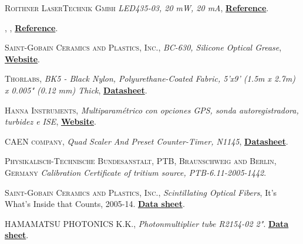\begin{thebibliography}{100}
 \textsc{Roithner LaserTechnik Gmbh}
\textit{LED435-03, 20 mW, 20 mA}, \href{http://www.roithner-laser.com/led_diverse.html}{\textbf{Reference}}.

 \textsc{},
\textit{}, \href{}{\textbf{Reference}}.

 \textsc{Saint-Gobain Ceramics and Plastics, Inc.},
\textit{BC-630, Silicone Optical Grease}, \href{https://www.crystals.saint-gobain.com/}{\textbf{Website}}.

 \textsc{Thorlabs},
\textit{BK5 - Black Nylon, Polyurethane-Coated Fabric, 5'x9' (1.5m x 2.7m) x 0.005" (0.12 mm) Thick}, \href{https://www.thorlabs.com/thorproduct.cfm?partnumber=BK5}{\textbf{Datasheet}}.

 \textsc{Hanna Instruments},
\textit{Multiparamétrico con opciones GPS, sonda autoregistradora, turbidez e ISE}, \href{https://www.hannainst.es/parametros/4654-multiparametrico-portatil-con-portasondas-multisensor-ph-orp-ce-od-temperatura.html#/507-cable_m-4_m/512-portasondas-si/513-portasondas_registrador-no/514-gps-no/515-turbidez-no}{\textbf{Website}}.


 \textsc{CAEN company},
\textit{Quad Scaler And Preset Counter-Timer, N1145}, \href{https://www.caen.it/products/n1145/}{\textbf{Datasheet}}.

 \textsc{Physikalisch-Technische Bundesanstalt, PTB, Braunschweig and Berlin, Germany}
\textit{Calibration Certificate of tritium source, PTB-6.11-2005-1442}.

 \textsc{Saint-Gobain Ceramics and Plastics, Inc.},
\textit{Scintillating Optical Fibers}, It's What's Inside that Counts, 2005-14. \href{https://www.crystals.saint-gobain.com/products/scintillating-fiber}{\textbf{Data sheet}}. 

 \textsc{HAMAMATSU PHOTONICS K.K.},
\textit{Photonmultiplier tube R2154-02 2"}. \href{https://www.hamamatsu.com/eu/en/product/type/R2154-02/index.html}{\textbf{Data sheet}}.


\end{thebibliography}
